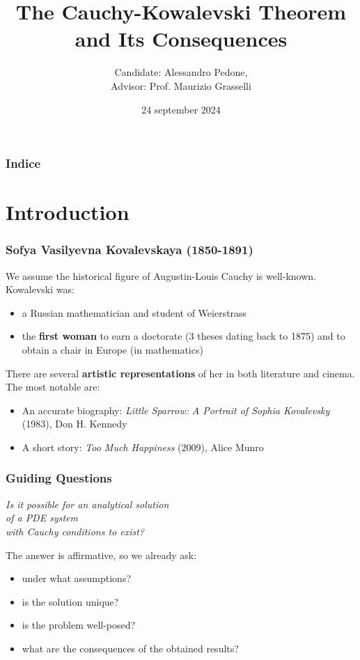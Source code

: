 \documentclass[serif,notheorems]{beamer}
\title{The Cauchy-Kowalevski Theorem\\ and Its Consequences }
\author{Candidate: Alessandro Pedone,\\ Advisor: Prof. Maurizio Grasselli }
\institute{Politecnico di Milano}
\date{24 september 2024}
\theoremstyle{definition} %
\theoremstyle{remark}
\begin{document}
\frame{\titlepage}
\begin{frame}
    \frametitle{Indice}
    \tableofcontents
\end{frame}


\section{Introduction}

\begin{frame}
\frametitle{Sofya Vasilyevna Kovalevskaya (1850-1891)}
We assume the historical figure of Augustin-Louis Cauchy is well-known. \\
Kowalevski was:
\begin{itemize}
\item a Russian mathematician and student of Weierstrass
\item the \textbf{first woman} to earn a doctorate (3 theses dating back to 1875) and to obtain a chair in Europe (in mathematics)
\end{itemize}
\end{frame}

\begin{frame}
There are several \textbf{artistic representations} of her in both literature and cinema. The most notable are:
\begin{itemize}
\item An accurate biography: \textit{Little Sparrow: A Portrait of Sophia Kovalevsky} (1983), Don H. Kennedy
\item A short story: \textit{Too Much Happiness} (2009), Alice Munro
\end{itemize}
\end{frame}


\begin{frame}
\frametitle{Guiding Questions}
\begin{center}
\textit{ Is it possible for an analytical solution \\ of a PDE system \\ with Cauchy conditions to exist?}
\end{center}
\end{frame}

\begin{frame}
The answer is affirmative, so we already ask:
\begin{itemize}
\item under what assumptions?
\item is the solution unique?
\item is the problem well-posed?
\item what are the consequences of the obtained results?
\end{itemize}
\end{frame}
\end{document}
